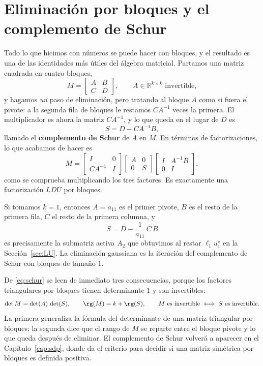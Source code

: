 \section{Eliminación por bloques y el complemento de Schur}
\label{sec:schur-complemento}

Todo lo que hicimos con números se puede hacer con bloques, y el resultado es
una de las identidades más útiles del álgebra matricial. Partamos una matriz
cuadrada en cuatro bloques,
\[
M = \begin{bmatrix} A & B\\ C & D\end{bmatrix},
\qquad A\in\mathbb{R}^{k\times k} \text{ invertible},
\]
y hagamos \emph{un} paso de eliminación, pero tratando al bloque $A$ como si
fuera el pivote: a la segunda fila de bloques le restamos $CA^{-1}$ veces la
primera. El multiplicador es ahora la matriz $CA^{-1}$, y lo que queda en el
lugar de $D$ es
\[
S = D - C A^{-1} B,
\]
llamado el \textbf{complemento de Schur} de $A$ en $M$. En términos de
factorizaciones, lo que acabamos de hacer es
\begin{equation}\label{eq:schur}
M =
\begin{bmatrix} I & 0\\ CA^{-1} & I\end{bmatrix}
\begin{bmatrix} A & 0\\ 0 & S\end{bmatrix}
\begin{bmatrix} I & A^{-1}B\\ 0 & I\end{bmatrix},
\end{equation}
como se comprueba multiplicando los tres factores. Es exactamente una
factorización $LDU$ por bloques.

\begin{remark}
Si tomamos $k=1$, entonces $A = a_{11}$ es el primer pivote, $B$ es el resto de
la primera fila, $C$ el resto de la primera columna, y
\[
S = D - \frac{1}{a_{11}}\,C\,B
\]
es precisamente la submatriz activa $A_2$ que obtuvimos al restar
$\ell_1 u_1^\star$ en la Sección~\ref{sec:LU}. La eliminación gaussiana es la
iteración del complemento de Schur con bloques de tamaño $1$.
\end{remark}

De \eqref{eq:schur} se leen de inmediato tres consecuencias, porque los factores
triangulares por bloques tienen determinante $1$ y son invertibles:
\[
\det M = \det(A)\,\det(S),
\qquad
\rg(M) = k + \rg(S),
\qquad
M \text{ es invertible} \iff S \text{ es invertible}.
\]
La primera generaliza la fórmula del determinante de una matriz triangular por
bloques; la segunda dice que el rango de $M$ se reparte entre el bloque pivote y
lo que queda después de eliminar. El complemento de Schur volverá a aparecer en
el Capítulo~\ref{cap:sdp}, donde da el criterio para decidir si una matriz
simétrica por bloques es definida positiva.

